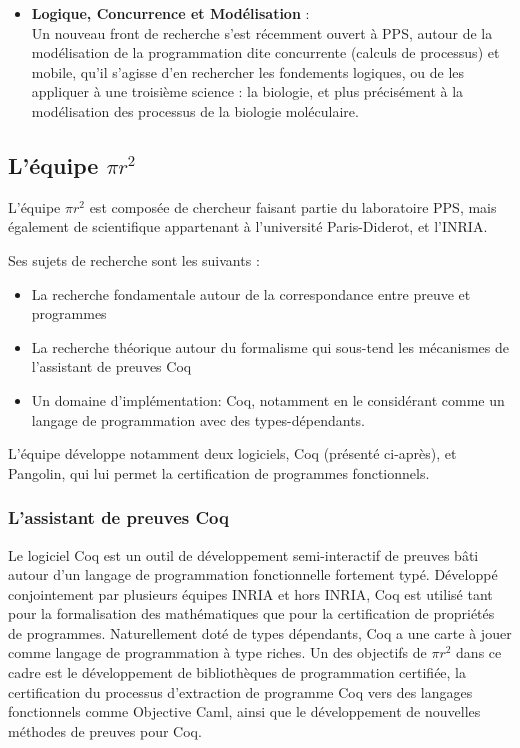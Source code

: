 \documentclass[a4paper, 11pt]{report}
\newcommand{\pir}[0]{\textbf{$\pi r^2$}\xspace}
\begin{document}
\begin{itemize}
          jusqu'au web. Ces développements sont étroitement liés à la
          logique mathématique, et permettent de mettre en évidence des
          propriétés sur ces programmes\footnote{Par exemple, le framework de
          développement web Ocsigen, donne la garantie de générer des pages
          web valides selon les standards W3C}.
        \item \textbf{Logique, Concurrence et Modélisation} : \\
          Un nouveau front de recherche s'est récemment ouvert à PPS, autour
          de la modélisation de la programmation dite concurrente (calculs de
          processus) et mobile, qu'il s'agisse d'en rechercher les fondements
          logiques, ou de les appliquer à une troisième science : la
          biologie, et plus précisément à la modélisation des processus de
          la biologie moléculaire.
      \end{itemize}

      \subsection{L'équipe \pir}
      L'équipe \pir{} est composée de chercheur faisant partie du laboratoire
      PPS, mais également de scientifique appartenant à l'université
      Paris-Diderot, et l'INRIA.

      Ses sujets de recherche sont les suivants :
      \begin{itemize}
        \item La recherche fondamentale autour de la correspondance entre preuve et programmes
        \item La recherche théorique autour du formalisme qui sous-tend les
          mécanismes de l'assistant de preuves Coq
        \item Un domaine d'implémentation: Coq, notamment en le considérant comme
          un langage de programmation avec des types-dépendants.
      \end{itemize}
      L'équipe développe notamment deux logiciels, Coq (présenté ci-après),
      et Pangolin, qui lui permet la certification de programmes fonctionnels.
      \subsubsection{L'assistant de preuves Coq}
      Le logiciel Coq est un outil de développement semi-interactif de
      preuves bâti autour d'un langage de programmation fonctionnelle
      fortement typé. Développé conjointement par plusieurs équipes INRIA et
      hors INRIA, Coq est utilisé tant pour la formalisation des
      mathématiques que pour la certification de propriétés de programmes.
      Naturellement doté de types dépendants, Coq a une carte à jouer comme
      langage de programmation à type riches. Un des objectifs de \pir dans
      ce cadre est le développement de bibliothèques de programmation
      certifiée, la certification du processus d'extraction de programme Coq
      vers des langages fonctionnels comme Objective Caml, ainsi que le
      développement de nouvelles méthodes de preuves pour Coq.
\end{document}
